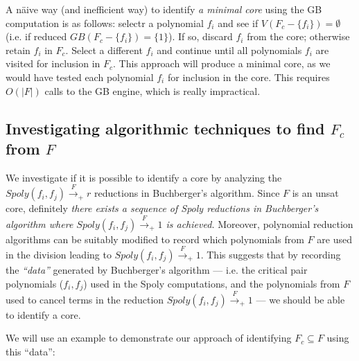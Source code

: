 A n\"aive way (and inefficient way) to identify {\it a minimal core}
using the GB computation is as follows:
selectr a polynomial $f_i$ and see if $V(F_c - \{f_i\}) = \emptyset$
(i.e. if reduced $GB(F_c - \{f_i\}) = \{1\}$). If so, discard $f_i$
from the core; otherwise retain $f_i$ in $F_c$. Select a different
$f_i$ and continue until all polynomials $f_i$ are visited for
inclusion in $F_c$. This approach will produce a minimal core, as we
would have tested each polynomial $f_i$ for inclusion in the
core. This requires $O(|F|)$ calls to the GB engine, which is really
impractical.   

\subsection{Investigating algorithmic techniques to find $F_c$ from $F$}

We investigate if it is possible to identify a core by analyzing the
$Spoly(f_i,f_j)\xrightarrow{F}_+ r$ reductions in Buchberger's
algorithm. Since $F$ is an unsat core, 
definitely {\it there exists  
a sequence of Spoly reductions in Buchberger's algorithm where
$Spoly(f_i, f_j) \xrightarrow{F}_+ 1$ is achieved.} Moreover, 
polynomial reduction algorithms can be suitably modified to record
which polynomials from $F$ are used in the division leading to
$Spoly(f_i,f_j)\xrightarrow{F}_+1$. This suggests that by recording
the {\it ``data''} generated by Buchberger's algorithm --- i.e. the
critical pair polynomials ($f_i,f_j$) used in the Spoly computations,
and the polynomials from $F$ used to cancel terms in the reduction
$Spoly(f_i,f_j)\xrightarrow{F}_+1$ --- we should be able to identify a
core. 

We will use an example to demonstrate our approach of identifying $F_c
\subseteq F$ using this ``data'':

